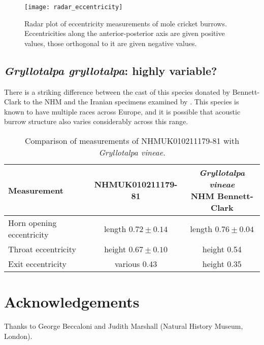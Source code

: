 \documentclass{article}
\begin{document}
      \begin{figure}[h]
      	\texttt{[image: radar\_eccentricity]}
      	\caption{Radar plot of eccentricity measurements of mole cricket burrows. Eccentricities along the anterior-posterior axis are given positive values, those orthogonal to it are given negative values.}
      	\label{fig:radar_eccentricity}
      \end{figure}
      
   
   \subsection{\textit{Gryllotalpa gryllotalpa}: highly variable?}
   There is a striking difference between the cast of this species donated by Bennett-Clark to the NHM and the Iranian specimens examined by \cite{jafari2015}. This species is known to have multiple races across Europe, and it is possible that acoustic burrow structure also varies considerably across this range.
   
   \begin{table}[h]
   	\begin{tabular}{|l|c|c|}
   		\hline 	Measurement &
		   		NHMUK010211179-81 &
		   		\makecell{\textit{Gryllotalpa vineae}\\NHM Bennett-Clark} \\ 
   		\hline  Horn opening eccentricity &
		   		length $0.72\pm0.14$ &
		   		length $0.76\pm0.04$  \\
   		\hline	Throat eccentricity &
		   		height $0.67\pm0.10$ &
		   		height 0.54 \\
   		\hline  Exit eccentricity &
		   		various 0.43 &
			   	height 0.35 \\
   		
   		\hline 
   	\end{tabular}
   	\caption{Comparison of measurements of NHMUK010211179-81 with \textit{Gryllotalpa vineae}.}
   	\label{tab:id_nhm_casts}
   \end{table}
   
   \section{Acknowledgements}
   Thanks to George Beccaloni and Judith Marshall (Natural History Museum, London).
   \printbibliography{}
\end{document}
